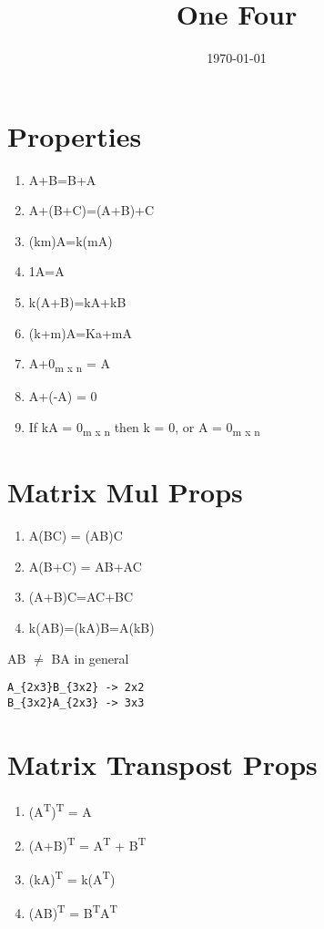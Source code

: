\documentclass[11pt]{article}
\date{\today}
\title{One Four}
\begin{document}
\maketitle
\tableofcontents

\section{Properties}
\label{sec:org60f12b8}
\begin{enumerate}
\item A+B=B+A
\item A+(B+C)=(A+B)+C
\item (km)A=k(mA)
\item 1A=A
\item k(A+B)=kA+kB
\item (k+m)A=Ka+mA
\item A+0\textsubscript{m x n} = A
\item A+(-A) = 0
\item If kA = 0\textsubscript{m x n} then k = 0, or A = 0\textsubscript{m x n}
\end{enumerate}
\section{Matrix Mul Props}
\label{sec:org25f2274}
\begin{enumerate}
\item A(BC) = (AB)C
\item A(B+C) = AB+AC
\item (A+B)C=AC+BC
\item k(AB)=(kA)B=A(kB)
\end{enumerate}

AB \(\neq\) BA in general

\begin{verbatim}
A_{2x3}B_{3x2} -> 2x2
B_{3x2}A_{2x3} -> 3x3
\end{verbatim}
\section{Matrix Transpost Props}
\label{sec:org8feafb6}
\begin{enumerate}
\item (A\textsuperscript{T})\textsuperscript{T} = A
\item (A+B)\textsuperscript{T} = A\textsuperscript{T} + B\textsuperscript{T}
\item (kA)\textsuperscript{T} = k(A\textsuperscript{T})
\item (AB)\textsuperscript{T} = B\textsuperscript{T}A\textsuperscript{T}
\end{enumerate}
\end{document}
